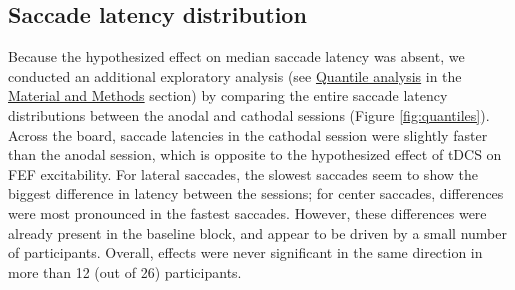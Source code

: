 \documentclass[11pt,]{memoir}
\begin{document}
\endgroup

\hypertarget{saccade-latency-distribution}{%
\subsection{Saccade latency distribution}\label{saccade-latency-distribution}}

Because the hypothesized effect on median saccade latency was absent, we conducted an additional exploratory analysis (see \protect\hyperlink{quantile-analysis}{Quantile analysis} in the \protect\hyperlink{sacc_tDCS-methods}{Material and Methods} section) by comparing the entire saccade latency distributions between the anodal and cathodal sessions (Figure \ref{fig:quantiles}). Across the board, saccade latencies in the cathodal session were slightly faster than the anodal session, which is opposite to the hypothesized effect of tDCS on FEF excitability. For lateral saccades, the slowest saccades seem to show the biggest difference in latency between the sessions; for center saccades, differences were most pronounced in the fastest saccades. However, these differences were already present in the baseline block, and appear to be driven by a small number of participants. Overall, effects were never significant in the same direction in more than 12 (out of 26) participants.
\end{document}
